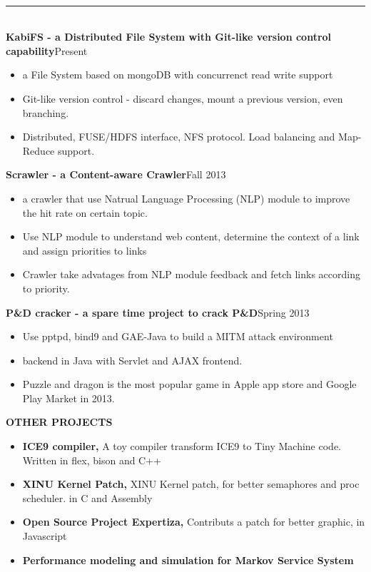 \documentclass[10pt,oneside,letter,final]{article}
\newenvironment{CVsection}[1]{
    \hspace*{20pt}{\bf \Large #1}\\[-3pt]
    \rule[5pt]{\textwidth}{1pt}\\
}{
    \hspace{-10pt}\hfill\\[10pt]
}
\newenvironment{CVproject}[2]{
    {\bf #1}\hfill #2\\[2pt]
    \begin{itemize}
        \setlength{\parsep}{0pt}
        \setlength{\itemsep}{0pt}\vspace{-16pt}
}{
    \end{itemize}
}
\begin{document}
    \begin{CVsection}{\Large P\large ROJECTS}
        \begin{CVproject}{KabiFS - a Distributed File System with Git-like version control capability}{Present}
            \item a File System based on mongoDB with concurrenct read write support
            \item Git-like version control - discard changes, mount a previous version, even branching.
            \item Distributed, FUSE/HDFS interface, NFS protocol. Load balancing and Map-Reduce support.
        \end{CVproject}
        
        \begin{CVproject}{Scrawler - a Content-aware Crawler}{Fall 2013}
            \item a crawler that use Natrual Language Processing (NLP) module to improve the hit rate on certain topic.
            \item Use NLP module to understand web content, determine the context of a link and  assign priorities to links
            \item Crawler take advatages from NLP module feedback and fetch links according to priority.
        \end{CVproject}
        
        \begin{CVproject}{P\&D cracker - a spare time project to crack P\&D}{Spring 2013}
            \item Use pptpd, bind9 and GAE-Java to build a MITM attack environment
            \item backend in Java with Servlet and AJAX frontend.
            \item Puzzle and dragon is the most popular game in Apple app store and Google Play Market in 2013.
        \end{CVproject}
        
        \begin{CVproject}{OTHER PROJECTS}{}
            \item {\bf ICE9 compiler,} A toy compiler transform ICE9 to Tiny Machine code. Written in flex, bison and C++
            \item {\bf XINU Kernel Patch,} XINU Kernel patch, for better semaphores and proc scheduler. in C and Assembly
            \item {\bf Open Source Project Expertiza,} Contributs a patch for better graphic, in Javascript
            \item {\bf {Performance modeling and simulation for Markov Service System}}
        \end{CVproject}
    \end{CVsection}
\end{document}
